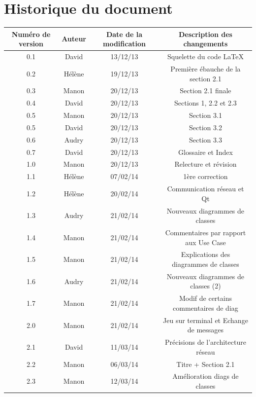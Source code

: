 \documentclass[a4paper,titlepage]{scrreprt}
\begin{document}
\section{Historique du document}
  \begin{tabular}{|c|c|c|c|}
    \hline
    Numéro de version & Auteur & Date de la modification & Description des changements \\
    \hline
    0.1 & David & 13/12/13 & Squelette du code \LaTeX \\
    0.2 & Hélène & 19/12/13 & Première ébauche de la section 2.1 \\
    0.3 & Manon & 20/12/13 & Section 2.1 finale \\
    0.4 & David & 20/12/13 & Sections 1,  2.2 et 2.3 \\
    0.5 & Manon & 20/12/13 & Section 3.1 \\
    0.5 & David & 20/12/13 & Section 3.2 \\
    0.6 & Audry & 20/12/13 & Section 3.3 \\
    0.7 & David & 20/12/13 & Glossaire et Index \\
    1.0 & Manon & 20/12/13 & Relecture et révision \\
    1.1 & Hélène & 07/02/14 & 1ère correction \\
    1.2 & Hélène & 20/02/14 & Communication réseau et Qt \\    
    1.3 & Audry & 21/02/14 & Nouveaux diagrammes de classes \\
    1.4 & Manon & 21/02/14 & Commentaires par rapport aux Use Case \\
    1.5 & Manon & 21/02/14 & Explications des diagrammes de classes \\
    1.6 & Audry & 21/02/14 & Nouveaux diagrammes de classes (2) \\
    1.7 & Manon & 21/02/14 & Modif de certains commentaires de diag \\
    2.0 & Manon & 21/02/14 & Jeu sur terminal et Echange de messages \\
    2.1 & David & 11/03/14 & Précisions de l'architecture réseau \\
    2.2 & Manon & 06/03/14 & Titre + Section 2.1 \\
    2.3 & Manon & 12/03/14 & Amélioration diags de classes \\

\end{tabular}
\end{document}
